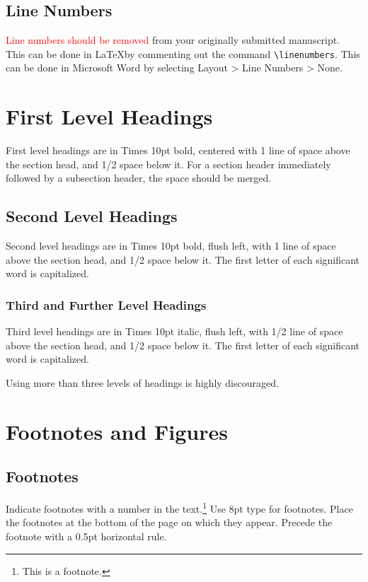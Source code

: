 \documentclass{article}
\begin{document}
\subsection{Line Numbers}

\textcolor{red}{Line numbers should be removed} from your originally submitted manuscript. This can be done in \LaTeX by commenting out the command \verb|\linenumbers|. This can be done in Microsoft Word by selecting Layout > Line Numbers > None.

\section{First Level Headings}

First level headings are in Times 10pt bold,
centered with 1 line of space above the section head, and 1/2 space below it.
For a section header immediately followed by a subsection header, the space should be merged.

\subsection{Second Level Headings}

Second level headings are in Times 10pt bold, flush left,
with 1 line of space above the section head, and 1/2 space below it.
The first letter of each significant word is capitalized.

\subsubsection{Third and Further Level Headings}

Third level headings are in Times 10pt italic, flush left,
with 1/2 line of space above the section head, and 1/2 space below it.
The first letter of each significant word is capitalized.

Using more than three levels of headings is highly discouraged.

\section{Footnotes and Figures}

\subsection{Footnotes}

Indicate footnotes with a number in the text.\footnote{This is a footnote.}
Use 8pt type for footnotes. Place the footnotes at the bottom of the page on which they appear.
Precede the footnote with a 0.5pt horizontal rule.
\end{document}
